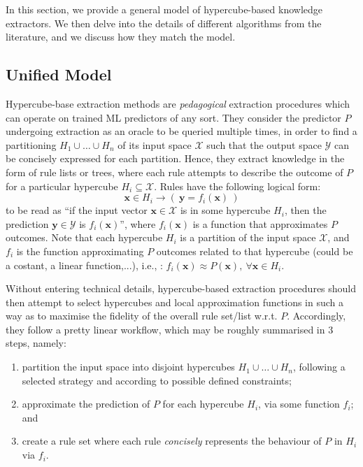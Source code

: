 \documentclass[
]{ceurart}
\begin{document}
In this section, we provide a general model of hypercube-based knowledge extractors.
%
We then delve into the details of different algorithms from the literature, and we discuss how they match the model.

\subsection{Unified Model}

Hypercube-base extraction methods are \emph{pedagogical} extraction procedures which can operate on trained ML predictors of any sort.
%
They consider the predictor $P$ undergoing extraction as an oracle to be queried multiple times, in order to find a partitioning $H_1 \cup \ldots \cup H_n$ of its input space $\mathcal{X}$ such that the output space $\mathcal{Y}$ can be concisely %
expressed for each partition.
%
Hence, they extract knowledge in the form of rule lists or trees, where each rule attempts to describe the outcome of $P$ for a particular hypercube $H_i \subseteq \mathcal{X}$. 
%
Rules have the following logical form: 
%
\[ \mathbf{x} \in H_i \rightarrow (~\mathbf{y} = f_i(\mathbf{x})~) \]  
%
to be read as ``if the input vector $\mathbf{x} \in \mathcal{X}$ is in some hypercube $H_i$, then the prediction $\mathbf{y} \in \mathcal{Y}$ is $f_i(\mathbf{x})$'', where $f_i(\mathbf{x})$ is a function that approximates $P$ outcomes.
%
Note that each hypercube $H_i$ is a partition of the input space $\mathcal{X}$, and $f_i$ is the function approximating $P$ outcomes related to that hypercube (could be a costant, a linear function,...), i.e., : $f_i(\mathbf{x}) \approx P(\mathbf{x}),~\forall \mathbf{x} \in H_i$.

Without entering technical details, hypercube-based extraction procedures should then attempt to select hypercubes and local approximation functions in such a way as to maximise the fidelity of the overall rule set/list w.r.t. $P$.
%
Accordingly, they follow a pretty linear workflow, which may be roughly summarised in 3 steps, namely:
%
\begin{enumerate}
	\item partition the input space into disjoint hypercubes $H_1 \cup \ldots \cup H_n$, following a selected strategy and according to possible defined constraints;
	\item approximate the prediction of $P$ for each hypercube $H_i$, via some function $f_i$; and
	\item create a rule set where each rule \emph{concisely} represents the behaviour of $P$ in $H_i$ via $f_i$.
\end{enumerate}
%
\end{document}
